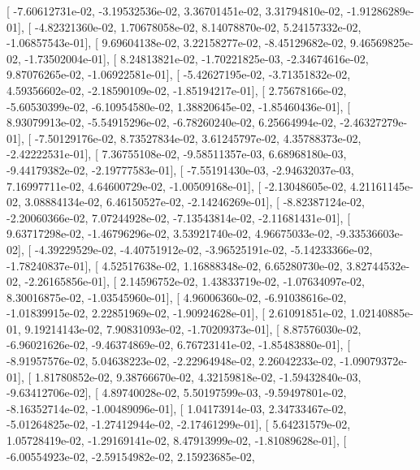 \documentclass{article}
\begin{document}
       [ -7.60612731e-02,  -3.19532536e-02,   3.36701451e-02,
          3.31794810e-02,  -1.91286289e-01],
       [ -4.82321360e-02,   1.70678058e-02,   8.14078870e-02,
          5.24157332e-02,  -1.06857543e-01],
       [  9.69604138e-02,   3.22158277e-02,  -8.45129682e-02,
          9.46569825e-02,  -1.73502004e-01],
       [  8.24813821e-02,  -1.70221825e-03,  -2.34674616e-02,
          9.87076265e-02,  -1.06922581e-01],
       [ -5.42627195e-02,  -3.71351832e-02,   4.59356602e-02,
         -2.18590109e-02,  -1.85194217e-01],
       [  2.75678166e-02,  -5.60530399e-02,  -6.10954580e-02,
          1.38820645e-02,  -1.85460436e-01],
       [  8.93079913e-02,  -5.54915296e-02,  -6.78260240e-02,
          6.25664994e-02,  -2.46327279e-01],
       [ -7.50129176e-02,   8.73527834e-02,   3.61245797e-02,
          4.35788373e-02,  -2.42222531e-01],
       [  7.36755108e-02,  -9.58511357e-03,   6.68968180e-03,
         -9.44179382e-02,  -2.19777583e-01],
       [ -7.55191430e-03,  -2.94632037e-03,   7.16997711e-02,
          4.64600729e-02,  -1.00509168e-01],
       [ -2.13048605e-02,   4.21161145e-02,   3.08884134e-02,
          6.46150527e-02,  -2.14246269e-01],
       [ -8.82387124e-02,  -2.20060366e-02,   7.07244928e-02,
         -7.13543814e-02,  -2.11681431e-01],
       [  9.63717298e-02,  -1.46796296e-02,   3.53921740e-02,
          4.96675033e-02,  -9.33536603e-02],
       [ -4.39229529e-02,  -4.40751912e-02,  -3.96525191e-02,
         -5.14233366e-02,  -1.78240837e-01],
       [  4.52517638e-02,   1.16888348e-02,   6.65280730e-02,
          3.82744532e-02,  -2.26165856e-01],
       [  2.14596752e-02,   1.43833719e-02,  -1.07634097e-02,
          8.30016875e-02,  -1.03545960e-01],
       [  4.96006360e-02,  -6.91038616e-02,  -1.01839915e-02,
          2.22851969e-02,  -1.90924628e-01],
       [  2.61091851e-02,   1.02140885e-01,   9.19214143e-02,
          7.90831093e-02,  -1.70209373e-01],
       [  8.87576030e-02,  -6.96021626e-02,  -9.46374869e-02,
          6.76723141e-02,  -1.85483880e-01],
       [ -8.91957576e-02,   5.04638223e-02,  -2.22964948e-02,
          2.26042233e-02,  -1.09079372e-01],
       [  1.81780852e-02,   9.38766670e-02,   4.32159818e-02,
         -1.59432840e-03,  -9.63412706e-02],
       [  4.89740028e-02,   5.50197599e-03,  -9.59497801e-02,
         -8.16352714e-02,  -1.00489096e-01],
       [  1.04173914e-03,   2.34733467e-02,  -5.01264825e-02,
         -1.27412944e-02,  -2.17461299e-01],
       [  5.64231579e-02,   1.05728419e-02,  -1.29169141e-02,
          8.47913999e-02,  -1.81089628e-01],
       [ -6.00554923e-02,  -2.59154982e-02,   2.15923685e-02,
\end{document}
